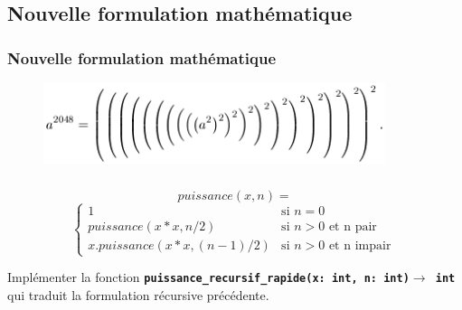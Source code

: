 \documentclass[svgnames,11pt]{beamer}
\begin{document}
\subsection{Nouvelle formulation mathématique}
\begin{frame}
    \frametitle{Nouvelle formulation mathématique}

    \begin{figure}[!h]
        \centering
        \includegraphics[width=10cm]{ressources/exponentiationrapide.png}
        \label{exponentiation}
        \end{figure}

\end{frame}
\begin{frame}
    \frametitle{}

    $$
puissance(x,n) = 
$$
$$\left\{
    \begin{array}{ll}
        1 & \mbox{si } n=0 \\
        puissance(x*x,n/2) & \mbox{si } n>0 \mbox{ et n pair}\\
        x.puissance(x*x,(n-1)/2) & \mbox{si } n>0 \mbox{ et n impair}\
    \end{array}
\right.$$
\begin{activite}
Implémenter la fonction \textbf{\texttt{puissance\_recursif\_rapide(x: int, n: int)$\rightarrow$ int }} qui traduit la formulation récursive précédente.
\end{activite}

\end{frame}
\end{document}
